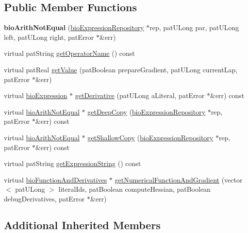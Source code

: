\subsection*{Public Member Functions}
\begin{DoxyCompactItemize}
\item 
\mbox{\label{classbio_arith_not_equal_ae92be935b4ddc30c035a0c6ddcf5e891}} 
{\bfseries bio\+Arith\+Not\+Equal} (\hyperlink{classbio_expression_repository}{bio\+Expression\+Repository} $\ast$rep, pat\+U\+Long par, pat\+U\+Long left, pat\+U\+Long right, pat\+Error $\ast$\&err)
\item 
virtual pat\+String \hyperlink{classbio_arith_not_equal_a70bfdbd3473869466dc02e026620996c}{get\+Operator\+Name} () const
\item 
virtual pat\+Real \hyperlink{classbio_arith_not_equal_aa081815819ab133fa2fbfc87ecef0e66}{get\+Value} (pat\+Boolean prepare\+Gradient, pat\+U\+Long current\+Lap, pat\+Error $\ast$\&err)
\item 
virtual \hyperlink{classbio_expression}{bio\+Expression} $\ast$ \hyperlink{classbio_arith_not_equal_ad06316415449cf1af6657a9932f819e2}{get\+Derivative} (pat\+U\+Long a\+Literal, pat\+Error $\ast$\&err) const
\item 
virtual \hyperlink{classbio_arith_not_equal}{bio\+Arith\+Not\+Equal} $\ast$ \hyperlink{classbio_arith_not_equal_a6b6319667f2a08c63854edfbd2cae799}{get\+Deep\+Copy} (\hyperlink{classbio_expression_repository}{bio\+Expression\+Repository} $\ast$rep, pat\+Error $\ast$\&err) const
\item 
virtual \hyperlink{classbio_arith_not_equal}{bio\+Arith\+Not\+Equal} $\ast$ \hyperlink{classbio_arith_not_equal_a22bcfcb7855cf992f9dc39d0911cebb5}{get\+Shallow\+Copy} (\hyperlink{classbio_expression_repository}{bio\+Expression\+Repository} $\ast$rep, pat\+Error $\ast$\&err) const
\item 
virtual pat\+String \hyperlink{classbio_arith_not_equal_a8fe4fd578218783f3a18665eae9f750c}{get\+Expression\+String} () const
\item 
virtual \hyperlink{classbio_function_and_derivatives}{bio\+Function\+And\+Derivatives} $\ast$ \hyperlink{classbio_arith_not_equal_ad9f06b2145f70fc6ebebc5bca51b5aa8}{get\+Numerical\+Function\+And\+Gradient} (vector$<$ pat\+U\+Long $>$ literal\+Ids, pat\+Boolean compute\+Hessian, pat\+Boolean debug\+Derivatives, pat\+Error $\ast$\&err)
\end{DoxyCompactItemize}
\subsection*{Additional Inherited Members}


